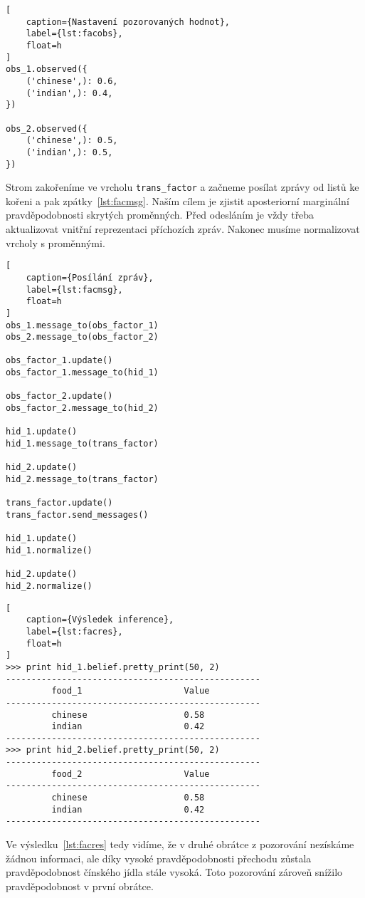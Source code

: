 \begin{lstlisting}[
	caption={Nastavení pozorovaných hodnot},
	label={lst:facobs},
	float=h
]
obs_1.observed({
	('chinese',): 0.6,
	('indian',): 0.4,
})

obs_2.observed({
	('chinese',): 0.5,
	('indian',): 0.5,
})
\end{lstlisting}

Strom zakořeníme ve vrcholu \texttt{trans\_factor} a začneme posílat zprávy od listů ke kořeni a pak zpátky~\ref{lst:facmsg}.
Naším cílem je zjistit aposteriorní marginální pravděpodobnosti skrytých proměnných.
Před odesláním je vždy třeba aktualizovat vnitřní reprezentaci příchozích zpráv.
Nakonec musíme normalizovat vrcholy s proměnnými.

\begin{lstlisting}[
	caption={Posílání zpráv},
	label={lst:facmsg},
	float=h
]
obs_1.message_to(obs_factor_1)
obs_2.message_to(obs_factor_2)

obs_factor_1.update()
obs_factor_1.message_to(hid_1)

obs_factor_2.update()
obs_factor_2.message_to(hid_2)

hid_1.update()
hid_1.message_to(trans_factor)

hid_2.update()
hid_2.message_to(trans_factor)

trans_factor.update()
trans_factor.send_messages()

hid_1.update()
hid_1.normalize()

hid_2.update()
hid_2.normalize()
\end{lstlisting}

\begin{lstlisting}[
	caption={Výsledek inference},
	label={lst:facres},
	float=h
]
>>> print hid_1.belief.pretty_print(50, 2)
--------------------------------------------------
         food_1                    Value          
--------------------------------------------------
         chinese                   0.58           
         indian                    0.42           
--------------------------------------------------
>>> print hid_2.belief.pretty_print(50, 2)
--------------------------------------------------
         food_2                    Value          
--------------------------------------------------
         chinese                   0.58           
         indian                    0.42           
--------------------------------------------------
\end{lstlisting}

Ve výsledku~\ref{lst:facres} tedy vidíme, že v druhé obrátce z pozorování nezískáme žádnou informaci, ale díky vysoké pravděpodobnosti přechodu zůstala pravděpodobnost čínského jídla stále vysoká.
Toto pozorování zároveň snížilo pravděpodobnost v první obrátce.

